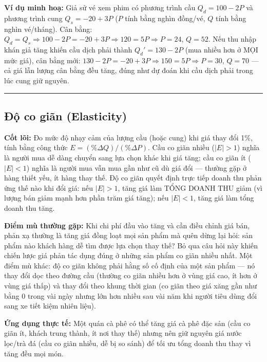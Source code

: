 \documentclass[
]{article}
\begin{document}
\textbf{Ví dụ minh hoạ:} Giả sử vé xem phim có phương trình cầu
\(Q_d = 100 - 2P\) và phương trình cung \(Q_s = -20 + 3P\) (\(P\) tính
bằng nghìn đồng/vé, \(Q\) tính bằng nghìn vé/tháng). Cân bằng:
\(Q_d = Q_s \Rightarrow 100 - 2P = -20 + 3P \Rightarrow 120 = 5P \Rightarrow P = 24\),
\(Q = 52\). Nếu thu nhập khán giả tăng khiến cầu dịch phải thành
\(Q_d' = 130 - 2P\) (mua nhiều hơn ở MỌI mức giá), cân bằng mới:
\(130 - 2P = -20 + 3P \Rightarrow 150 = 5P \Rightarrow P = 30\),
\(Q = 70\) --- cả giá lẫn lượng cân bằng đều tăng, đúng như dự đoán khi
cầu dịch phải trong lúc cung giữ nguyên.

\begin{center}\rule{0.5\linewidth}{0.5pt}\end{center}

\subsection{Độ co giãn
(Elasticity)}\label{ux111ux1ed9-co-giuxe3n-elasticity}

\textbf{Cốt lõi:} Đo mức độ nhạy cảm của lượng cầu (hoặc cung) khi giá
thay đổi 1\%, tính bằng công thức \(E = (\%\Delta Q) / (\%\Delta P)\).
Cầu co giãn nhiều (\(|E| > 1\)) nghĩa là người mua dễ dàng chuyển sang
lựa chọn khác khi giá tăng; cầu co giãn ít (\(|E| < 1\)) nghĩa là người
mua vẫn mua gần như cũ dù giá đổi --- thường gặp ở hàng thiết yếu, ít
hàng thay thế. Độ co giãn quyết định trực tiếp doanh thu phản ứng thế
nào khi đổi giá: nếu \(|E| > 1\), tăng giá làm TỔNG DOANH THU giảm (vì
lượng bán giảm mạnh hơn phần trăm giá tăng); nếu \(|E| < 1\), tăng giá
làm tổng doanh thu tăng.

\textbf{Điểm mù thường gặp:} Khi chi phí đầu vào tăng và cần điều chỉnh
giá bán, phản xạ thường là tăng giá đồng loạt mọi sản phẩm mà quên dừng
lại hỏi: sản phẩm nào khách hàng dễ tìm được lựa chọn thay thế? Bỏ qua
câu hỏi này khiến chiến lược giá phản tác dụng đúng ở những sản phẩm co
giãn nhiều nhất. Một điểm mù khác: độ co giãn không phải hằng số cố định
của một sản phẩm --- nó thay đổi dọc theo đường cầu (thường co giãn
nhiều hơn ở vùng giá cao, ít hơn ở vùng giá thấp) và thay đổi theo khung
thời gian (co giãn theo giá xăng gần như bằng 0 trong vài ngày nhưng lớn
hơn nhiều sau vài năm khi người tiêu dùng đổi sang xe tiết kiệm nhiên
liệu).

\textbf{Ứng dụng thực tế:} Một quán cà phê có thể tăng giá cà phê đặc
sản (cầu co giãn ít, khách trung thành, ít nơi thay thế) nhưng nên giữ
nguyên giá nước lọc/trà đá (cầu co giãn nhiều, dễ bị so sánh) để tối ưu
tổng doanh thu thay vì tăng đều mọi món.
\end{document}
